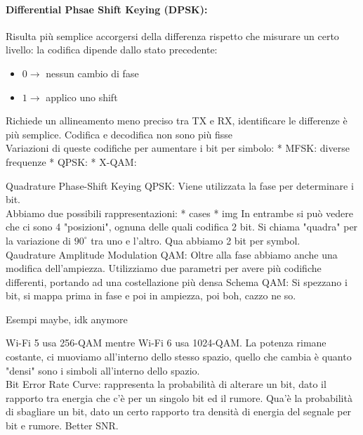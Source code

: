 \newpage

\paragraph{Differential Phsae Shift Keying (DPSK):} Risulta più semplice accorgersi della differenza rispetto che misurare un certo livello: la codifica dipende dallo stato precedente: 
\begin{itemize}
	\item $0 \rightarrow$ nessun cambio di fase
	\item $1 \rightarrow$ applico uno shift
\end{itemize}

Richiede un allineamento meno preciso tra TX e RX, identificare le differenze è più semplice.  Codifica e decodifica non sono più fisse\\


Variazioni di queste codifiche per aumentare i bit per simbolo: 
* MFSK: diverse frequenze
* QPSK:
* X-QAM:

Quadrature Phase-Shift Keying QPSK: Viene utilizzata la fase per determinare i bit. \\
Abbiamo due possibili rappresentazioni: %
* cases
* img
In entrambe si può vedere che ci sono 4 "posizioni", ognuna delle quali codifica 2 bit. Si chiama "quadra" per la variazione di $90^\circ$ tra uno e l'altro. Qua abbiamo 2 bit per symbol.\\

Qaudrature Amplitude Modulation QAM: Oltre alla fase abbiamo anche una modifica dell'ampiezza. Utilizziamo due parametri per avere più codifiche differenti, portando ad una costellazione più densa
Schema QAM:
Si spezzano i bit, si mappa prima in fase e poi in ampiezza, poi boh, cazzo ne so.

Esempi maybe, idk anymore

Wi-Fi 5 usa 256-QAM mentre Wi-Fi 6 usa 1024-QAM. La potenza rimane costante, ci muoviamo all'interno dello stesso spazio, quello che cambia è quanto "densi" sono i simboli all'interno dello spazio.\\

Bit Error Rate Curve: rappresenta la probabilità di alterare un bit, dato il rapporto tra energia che c'è per un singolo bit ed il rumore. %
Qua'è la probabilità di sbagliare un bit, dato un certo rapporto tra densità di energia del segnale per bit e rumore. Better SNR.\\

